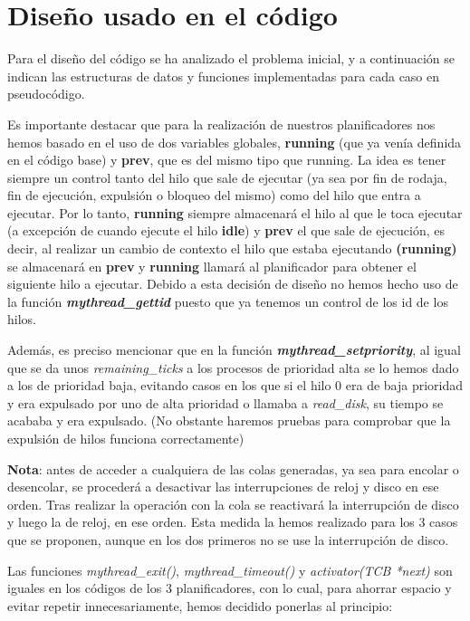 \documentclass[10pt, spanish, pdftex]{template/UC3M_document}
\begin{document}
\section{Diseño usado en el código}
Para el diseño del código se ha analizado el problema inicial, y a continuación se indican las estructuras de datos y funciones implementadas para cada caso en pseudocódigo. 

Es importante destacar que para la realización de nuestros planificadores nos hemos basado en el uso de dos variables globales, \textbf{running} (que ya venía definida en el código base) y \textbf{prev}, que es del mismo tipo que running. La idea es tener siempre un control tanto del hilo que sale de ejecutar (ya sea por fin de rodaja, fin de ejecución, expulsión o bloqueo del mismo) como del hilo que entra a ejecutar. Por lo tanto, \textbf{running} siempre almacenará el hilo al que le toca ejecutar (a excepción de cuando ejecute el hilo \textbf{idle}) y \textbf{prev} el que sale de ejecución, es decir, al realizar un cambio de contexto el hilo que estaba ejecutando \textbf{(running)} se almacenará en \textbf{prev} y \textbf{running} llamará al planificador para obtener el siguiente hilo a ejecutar. Debido a esta decisión de diseño no hemos hecho uso de la función \textbf{\textit{mythread\_gettid}} puesto que ya tenemos un control de los id de los hilos.

Además, es preciso mencionar que en la función \textbf{\textit{mythread\_setpriority}}, al igual que se da unos \textit{remaining\_ticks} a los procesos de prioridad alta se lo hemos dado a los de prioridad baja, evitando casos en los que si el hilo 0 era de baja prioridad y era expulsado por uno de alta prioridad o llamaba a \textit{read\_disk}, su tiempo se acababa y era expulsado. (No obstante haremos pruebas para comprobar que la expulsión de hilos funciona correctamente)

\textbf{Nota}: antes de acceder a cualquiera de las colas generadas, ya sea para encolar o desencolar, se procederá a desactivar las interrupciones de reloj y disco en ese orden. Tras realizar la operación con la cola se reactivará la interrupción de disco y luego la de reloj, en ese orden. Esta medida la hemos realizado para los 3 casos que se proponen, aunque en los dos primeros no se use la interrupción de disco.

Las funciones \textit{mythread\_exit()}, \textit{mythread\_timeout()} y \textit{activator(TCB *next)} son iguales en los códigos de los 3 planificadores, con lo cual, para ahorrar espacio y evitar repetir innecesariamente, hemos decidido ponerlas al principio:
\end{document}
